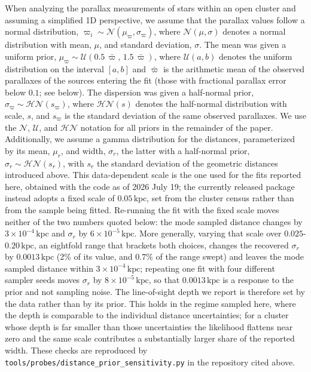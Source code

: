 \documentclass{aa}
\begin{document}
When analyzing the parallax measurements of stars within an open cluster and assuming a simplified 1D perspective, we assume that the parallax values follow a normal distribution, $\varpi_i \sim \mathcal{N}(\mu_\varpi,\sigma_\varpi)$, where $\mathcal{N}(\mu,\sigma)$ denotes a normal distribution with mean, $\mu$, and standard deviation, $\sigma$. The mean was given a uniform prior, $\mu_\varpi \sim \mathcal{U}(0.5\,\bar{\varpi},\,1.5\,\bar{\varpi})$, where $\mathcal{U}(a,b)$ denotes the uniform distribution on the interval $[a,b]$ and $\bar{\varpi}$ is the arithmetic mean of the observed parallaxes of the sources entering the fit (those with fractional parallax error below $0.1$; see below). The dispersion was given a half-normal prior, $\sigma_\varpi \sim \mathcal{HN}(s_\varpi)$, where $\mathcal{HN}(s)$ denotes the half-normal distribution with scale, $s$, and $s_\varpi$ is the standard deviation of the same observed parallaxes. We use the $\mathcal{N}$, $\mathcal{U}$, and $\mathcal{HN}$ notation for all priors in the remainder of the paper. Additionally, we assume a gamma distribution for the distances, parameterized by its mean, $\mu_r$, and width, $\sigma_r$, the latter with a half-normal prior, $\sigma_r \sim \mathcal{HN}(s_r)$, with $s_r$ the standard deviation of the geometric distances introduced above. This data-dependent scale is the one used for the fits reported here, obtained with the code as of 2026 July 19; the currently released package instead adopts a fixed scale of $0.05\,\mathrm{kpc}$, set from the \citet{2024arXiv240305143H} cluster census rather than from the sample being fitted. Re-running the fit with the fixed scale moves neither of the two numbers quoted below: the mode sampled distance changes by $3\times10^{-4}\,\mathrm{kpc}$ and $\sigma_r$ by $6\times10^{-5}\,\mathrm{kpc}$. More generally, varying that scale over $0.025$-$0.20\,\mathrm{kpc}$, an eightfold range that brackets both choices, changes the recovered $\sigma_r$ by $0.0013\,\mathrm{kpc}$ ($2\%$ of its value, and $0.7\%$ of the range swept) and leaves the mode sampled distance within $3\times10^{-4}\,\mathrm{kpc}$; repeating one fit with four different sampler seeds moves $\sigma_r$ by $8\times10^{-5}\,\mathrm{kpc}$, so that $0.0013\,\mathrm{kpc}$ is a response to the prior and not sampling noise. The line-of-sight depth we report is therefore set by the data rather than by its prior. This holds in the regime sampled here, where the depth is comparable to the individual distance uncertainties; for a cluster whose depth is far smaller than those uncertainties the likelihood flattens near zero and the same scale contributes a substantially larger share of the reported width. These checks are reproduced by \texttt{tools/probes/distance\_prior\_sensitivity.py} in the repository cited above.
\end{document}
